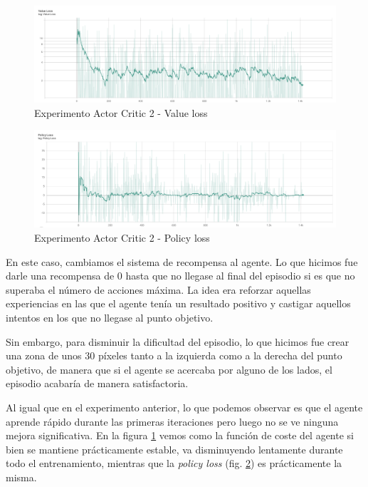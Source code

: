 \begin{figure}[H]
	\centering
	\includegraphics[width=1\textwidth]{figuras/experiments/actor_critic/actor_critic_no_rewards_till_complete/value_loss.png}
	\caption[Experimento Actor Critic 2 - Duración de los episodios]{Experimento Actor Critic 2 - Value loss}
	\label{fig-experimento-actor-critic-2-value-loss}
\end{figure}
\begin{figure}[H]
	\centering
	\includegraphics[width=1\textwidth]{figuras/experiments/actor_critic/actor_critic_no_rewards_till_complete/policy_loss.png}
	\caption[Experimento Actor Critic 2 - Duración de los episodios]{Experimento Actor Critic 2 - Policy loss}
	\label{fig-experimento-actor-critic-2-policy-loss}
\end{figure}

En este caso, cambiamos el sistema de recompensa al agente. Lo que hicimos fue darle una recompensa de 0 hasta que no llegase al final del episodio si es que no superaba el número de acciones máxima. La idea era reforzar aquellas experiencias en las que el agente tenía un resultado positivo y castigar aquellos intentos en los que no llegase al punto objetivo.
\medskip

Sin embargo, para disminuir la dificultad del episodio, lo que hicimos fue crear una zona de unos 30 píxeles tanto a la izquierda como a la derecha del punto objetivo, de manera que si el agente se acercaba por alguno de los lados, el episodio acabaría de manera satisfactoria.
\medskip

Al igual que en el experimento anterior, lo que podemos observar es que el agente aprende rápido durante las primeras iteraciones pero luego no se ve ninguna mejora significativa. En la figura \ref{fig-experimento-actor-critic-2-value-loss} vemos como la función de coste del agente si bien se mantiene prácticamente estable, va disminuyendo lentamente durante todo el entrenamiento, mientras que la \textit{policy loss} (fig. \ref{fig-experimento-actor-critic-2-policy-loss}) es prácticamente la misma.
\medskip

